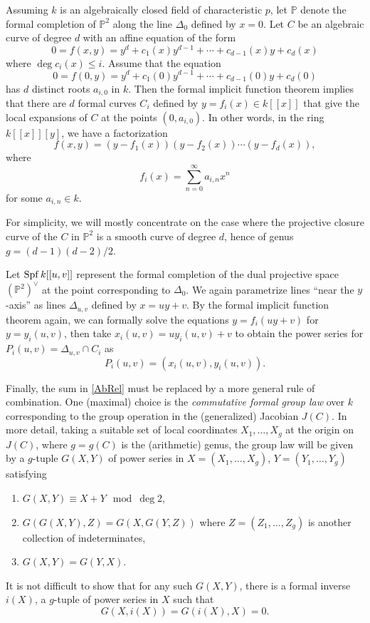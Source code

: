 \documentclass[12pt]{amsart}
\theoremstyle{theorem}
\newcommand{\PP}{\mathbb{P}}
\begin{document}
Assuming $k$ is an algebraically closed field of characteristic $p$, let $\PP$ denote the formal completion
of $\PP^2$ along the line $\Delta_0$ defined by $x = 0$.   Let $C$ be an algebraic curve of degree $d$ with an affine
equation of the form 
$$0 = f(x,y) = y^d + c_1(x) y^{d-1} + \cdots + c_{d-1}(x) y + c_d(x)$$
where $\deg c_i(x) \le i$.  Assume that the equation 
$$0 = f(0,y) = y^d + c_1(0) y^{d-1} + \cdots + c_{d-1}(0) y + c_d(0)$$
has $d$ distinct roots $a_{i,0}$ in $k$.  
Then the formal implicit function theorem implies that there are $d$ formal curves $C_i$ defined by 
$y = f_i(x) \in k[[x]]$ that give the local expansions of $C$ at the points $(0,a_{i,0})$.  
In other words, in the ring $k[[x]][y]$, we have a factorization
$$f(x,y) = (y - f_1(x))(y - f_2(x)) \cdots (y - f_d(x)),$$
where 
$$f_i(x) = \sum_{n=0}^\infty a_{i,n} x^n$$
for some $a_{i,n} \in k$.

For simplicity, we will mostly concentrate on the case where the projective closure curve of the $C$ in $\PP^2$
is a smooth curve of degree $d$, hence of genus $g = (d - 1)(d - 2)/2$.

Let ${\rm Spf}\, k[[u,v]]$
represent the formal completion of the dual projective space $(\PP^2)^\vee$ at the point corresponding to $\Delta_0$.
We again parametrize lines ``near the $y$-axis'' as lines $\Delta_{u,v}$ defined by $x = uy + v$.  By the formal 
implicit function theorem again, we can formally solve the equations $y = f_i(uy + v)$ for $y = y_i(u,v)$, then 
take $x_i(u,v) = u y_i(u,v) + v$ to obtain the power series for 
$P_i(u,v) = \Delta_{u,v} \cap C_i$ as 
$$P_i(u,v) = (x_i(u,v), y_i(u,v)).$$

Finally, the sum in \eqref{AbRel} must be replaced by a more general rule of combination.  One (maximal) choice is the 
\emph{commutative formal group law} over $k$ corresponding to the group operation in the (generalized) Jacobian $J(C)$.  In more 
detail, taking a suitable set of local coordinates $X_1, \ldots, X_g$ at the origin on $J(C)$, where
$g = g(C)$ is the (arithmetic) genus, the group law will be given by a $g$-tuple $G(X,Y)$ of power series in $X = (X_1, \ldots, X_g)$, 
$Y = (Y_1, \ldots, Y_g)$ satisfying 
\begin{enumerate}
\item $G(X,Y) \equiv X + Y \mod \deg 2$,
\item $G(G(X,Y),Z) = G(X,G(Y,Z))$ where $Z = (Z_1,\ldots,Z_g)$ is another collection of indeterminates,
\item $G(X,Y) = G(Y,X)$.
\end{enumerate}
It is not difficult to show that for any such $G(X,Y)$, there is a formal inverse $i(X)$, a $g$-tuple of 
power series in $X$ such that 
$$G(X,i(X)) = G(i(X),X) = 0.$$
\end{document}
